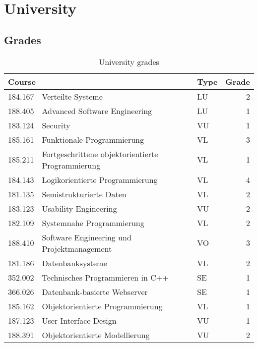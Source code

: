 
\section{University}




\subsection{Grades}

\begin{center}
\begin{table}[h]
\caption{University grades}
\begin{tabular}{ r | l | l | r }
    \hline
    \multicolumn{2}{l|}{\textbf{Course}} & \textbf{Type} & \textbf{Grade} \\
    \hline \hline
    184.167 & Verteilte Systeme & LU & 2 \\ \hline
    188.405 & Advanced Software Engineering & LU & 1 \\ \hline
    183.124 & Security & VU & 1 \\ \hline
    185.161 & Funktionale Programmierung & VL & 3 \\ \hline
    185.211 & Fortgeschrittene objektorientierte Programmierung & VL & 1 \\
    \hline 184.143 & Logikorientierte Programmierung & VL & 4 \\ \hline
    181.135 & Semistrukturierte Daten & VL & 2 \\ \hline
    183.123 & Usability Engineering & VU & 2 \\ \hline
    182.109 & Systemnahe Programmierung & VL & 2 \\ \hline
    188.410 & Software Engineering und Projektmanagement & VO & 3 \\ \hline
    181.186 & Datenbanksysteme & VL & 2 \\ \hline
    352.002 & Technisches Programmieren in C++ & SE & 1 \\ \hline
    366.026 & Datenbank-basierte Webserver & SE & 1 \\ \hline
    185.162 & Objektorientierte Programmierung & VL & 1 \\ \hline
    187.123 & User Interface Design & VU & 1 \\ \hline
    188.391 & Objektorientierte Modellierung & VU & 2 \\ \hline

\end{tabular}
\end{table}
\end{center}
